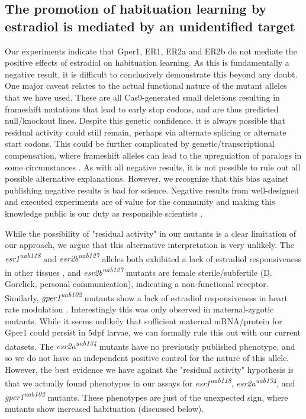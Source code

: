 \documentclass[9.5pt,lineno]{RandlettLab_elife}
\begin{document}
{\subsection{The promotion of habituation learning by estradiol is mediated by an unidentified target} 
Our experiments indicate that Gper1, ER1, ER2a and ER2b do not mediate the positive effects of estradiol on habituation learning. 
As this is fundamentally a negative result, it is difficult to conclusively demonstrate this beyond any doubt. 
One major caveat relates to the actual functional nature of the mutant alleles that we have used. 
These are all Cas9-generated small deletions resulting in frameshift mutations that lead to early stop codons, and are thus predicted null/knockout lines. 
Despite this genetic confidence, it is always possible that residual activity could still remain, perhaps via alternate splicing or alternate start codons. 
This could be further complicated by genetic/transcriptional compensation, where frameshift alleles can lead to the upregulation of paralogs in some circumstances \citep{El-Brolosy2019-uq}.
As with all negative results, it is not possible to rule out all possible alternative explanations. 
However, we recognize that this bias against publishing negative results is bad for science. 
Negative results from well-designed and executed experiments are of value for the community and making this knowledge public is our duty as responsible scientists \citep{Mlinaric2017-kr}. 

While the possibility of "residual activity" in our mutants is a clear limitation of our approach, we argue that this alternative interpretation is very unlikely. The \emph{esr1\textsuperscript{uab118}} and \emph{esr2b\textsuperscript{uab127}} alleles both exhibited a lack of estradiol responsiveness in other tissues \citep{Romano2017-ep}, and \emph{esr2b\textsuperscript{uab127}} mutants are female sterile/subfertile (D. Gorelick, personal communication), indicating a non-functional receptor.
Similarly, \emph{gper1\textsuperscript{uab102}} mutants show a lack of estradiol responsiveness in heart rate modulation \citep{Romano2017-ep}. 
Interestingly this was only observed in maternal-zygotic mutants. 
While it seems unlikely that sufficient maternal mRNA/protein for Gper1 could persist in 5dpf larvae, we can formally rule this out with our current datasets. 
The \emph{esr2a\textsuperscript{uab134}} mutants have no previously published phenotype, and so we do not have an independent positive control for the nature of this allele. However, the best evidence we have against the "residual activity" hypothesis is that we actually found phenotypes in our assays for \emph{esr1\textsuperscript{uab118}}, \emph{esr2a\textsuperscript{uab134}},  and \emph{gper1\textsuperscript{uab102}} mutants. 
These phenotypes are just of the unexpected sign, where mutants show increased habituation (discussed below). 

}
\end{document}
